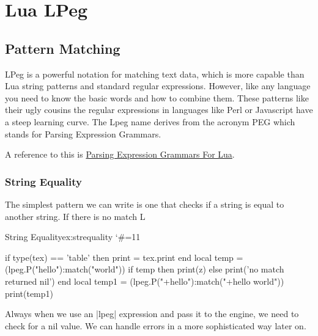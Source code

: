 \makeatletter
\long{}

   
\newenvironment{docLpeg}[1]{
  \auxm#1;
  }  
{%
\@@par
\smallskip\parindent=1em }
\makeatother

\chapter{Lua LPeg}

\section{Pattern Matching}

LPeg is a powerful notation for matching text data, which is more capable than Lua string patterns and standard regular expressions. However, like any language you need to know the basic words and how to combine them. These patterns like their ugly cousins the regular expressions in languages like Perl or Javascript have a steep learning curve. The Lpeg name derives from the acronym PEG which stands for Parsing Expression Grammars. 

A reference to this is \href{http://www.inf.puc-rio.br/~roberto/lpeg/}{Parsing Expression Grammars For Lua}. 

\subsection{String Equality}

The simplest pattern we can write is one that checks if a string is equal to another string. If there is no match L

\begin{texexample}{String Equality}{ex:strequality}
\bgroup
\catcode`\#=11
\begin{luacode}
if type(tex) == 'table' then print = tex.print end
local temp = (lpeg.P("hello"):match("world")) 
if temp then
   print(z)
   else print('no match returned nil') 
end   
local temp1 = (lpeg.P("+hello"):match("+hello world")) 
print(temp1)
\end{luacode}
\egroup
\end{texexample}


Always when we use an |lpeg| expression and pass it to the \tex engine, we need to check for a nil value. We can handle errors
in a more sophisticated way later on.


